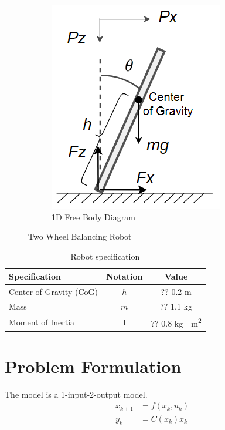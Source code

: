 \documentclass[12pt]{article}
\begin{document}
\begin{figure}
\begin{subfigure}{0.3\textwidth}
\includegraphics[width=\linewidth]{./figures/free_body_diagram.png}
\caption{1D Free Body Diagram} \label{fig_1d_free_body_diagram}
\end{subfigure}
\caption{Two Wheel Balancing Robot} \label{fig_robots}
\end{figure}


\begin{table}
  \centering
  \begin{tabular}{l|c|c}
    \hline
	Specification & Notation & Value \\ \hline
    Center of Gravity (CoG) & $h$ & ?? 0.2 m \\ 
	Mass & $m$ & ?? 1.1 kg \\ 
	Moment of Inertia & I & ?? 0.8 \si{\kilogram\cdot\meter^2} \\ \hline
  \end{tabular}
  \caption{Robot specification} 
  \label{tab_robot_specification}
\end{table}


\section{Problem Formulation}
The model is a 1-input-2-output model.
\begin{align}
\label{equ_orig_nonlinear_dynamics}
x_{k+1} & = f(x_k, u_k) \\
y_k & = C(x_k)x_k
\end{align}
\end{document}
